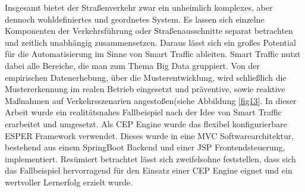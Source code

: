 Insgesamt bietet der Straßenverkehr zwar ein unheimlich komplexes, aber dennoch wohldefiniertes und geordnetes System. Es lassen sich einzelne Komponenten der Verkehrsführung oder Straßenausschnitte separat betrachten und zeitlich unabhängig zusammensetzen. Daraus lässt sich ein großes Potential für die Automatisierung im Sinne von Smart Traffic ableiten. Smart Traffic nutzt dabei alle Bereiche, die man zum Thema Big Data gruppiert. Von der empirischen Datenerhebung, über die Musterentwicklung, wird schließlich die Mustererkennung im realen Betrieb eingesetzt und präventive, sowie reaktive Maßnahmen auf Verkehrsszenarien angestoßen(siehe Abbildung \ref{fig13}.
In dieser Arbeit wurde ein realitätsnahes Fallbeispiel nach der Idee von Smart Traffic erarbeitet und umgesetzt. Als CEP Engine wurde das flexibel konfigurierbare ESPER Framework verwendet. Dieses wurde in eine MVC  Softwarearchitektur, bestehend aus einem SpringBoot Backend und einer JSP  Frontendsteuerung, implementiert. Resümiert betrachtet lässt sich zweifelsohne feststellen, dass sich das Fallbeispiel hervorragend für den Einsatz einer CEP Engine eignet und ein wertvoller Lernerfolg erzielt wurde.




